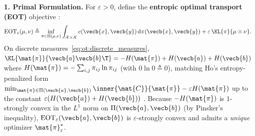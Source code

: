 \documentclass[../../../../master.tex]{subfiles}
\begin{document}
\begin{coremath}
\label{cm:ot:entropic_sinkhorn}
\textbf{1. Primal Formulation.} For $\varepsilon > 0$, define the \textbf{entropic optimal transport (EOT)} objective  :
\begin{equation}
\label{eq:ot:eot_primal}
  \mathrm{EOT}_\varepsilon(\mu, \nu) \triangleq \inf_{\pi \in \Pi(\mu, \nu)} \int_{\mathcal{X} \times \mathcal{X}} c(\vecb{x}, \vecb{y})\,\mathrm{d}\pi(\vecb{x}, \vecb{y}) + \varepsilon\,\KL{\pi}{\mu \otimes \nu}.
\end{equation}
On discrete measures~\eqref{eq:ot:discrete_measures}, $\KL{\mat{\pi}}{\vecb{a}\vecb{b}\T} = -H(\mat{\pi}) + H(\vecb{a}) + H(\vecb{b})$ where $H(\mat{\pi}) = -\sum_{i,j} \pi_{ij}\ln \pi_{ij}$ (with $0\ln 0 \triangleq 0$), matching Ho's entropy-penalized form $\min_{\mat{\pi} \in \Pi(\vecb{a},\vecb{b})} \inner{\mat{C}}{\mat{\pi}} - \varepsilon H(\mat{\pi})$ up to the constant $\varepsilon(H(\vecb{a}) + H(\vecb{b}))$ . Because $-H(\mat{\pi})$ is $1$-strongly convex in the $L^1$ norm on $\Pi(\vecb{a},\vecb{b})$ (by Pinsker's inequality), $\mathrm{EOT}_\varepsilon(\vecb{a},\vecb{b})$ is $\varepsilon$-strongly convex and admits a \emph{unique} optimizer $\mat{\pi}_\varepsilon^\star$.


\end{coremath}
\end{document}
